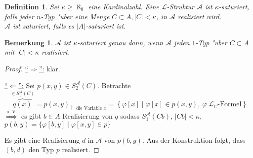 \documentclass[a4paper,12pt,numbers=noenddot,parskip=full]{scrartcl}
\newcommand{\scrL}{\mathcal{L}}
\newcommand{\scrA}{\mathcal{A}}
\theoremstyle{dotless}
\newtheorem{definition}[theorem]{Definition}
\newtheorem{remark}[theorem]{Bemerkung}
\begin{document}
\begin{definition}
	Sei $\kappa \geq \aleph_0$ eine Kardinalzahl. Eine $\scrL$-Struktur $\scrA$ ist \emph{$\kappa$-saturiert}, falls jeder $n$-Typ "uber eine Menge $C \subset A, |C|<\kappa$, in $\scrA$ realisiert wird.\\
	$\scrA$ ist \emph{saturiert}, falls es $|A|$-saturiert ist.
\end{definition}
\begin{remark}
	$\scrA$ ist $\kappa$-saturiert genau dann, wenn $\scrA$ jeden $1$-Typ "uber $C \subset A$ mit $|C| < \kappa$ realisiert.
\end{remark}
\begin{proof}
	\underline{"`$\Rightarrow$"':} klar.
	
	\underline{"`$\Leftarrow$"':} Sei $p(x,y) \in S_2^\scrA(C)$. Betrachte \begin{equation*}
		\overbrace{q(x)}^{\in S_1^\scrA(C)} = p(x,y)_{\upharpoonright \text{ die Variable }x}=\left\{\varphi[x] \mid \varphi[x] \in p(x,y),~ \varphi~\scrL_C \text{-Formel} \right\}
	\end{equation*}
	$\overset{\text{n. V.}}{\Longrightarrow}$ es gibt $b \in A$ Realisierung von $q$ sodass $S_1^\scrA(Cb)$, $|Cb| < \kappa$, $p(b,y) = \{\varphi[b,y] \mid \varphi[x,y] \in p \}$
	
	Es gibt eine Realisierung $d$ in $\scrA$ von $p(b,y)$. Aus der Konstruktion folgt, dass $(b,d)$ den Typ $p$ realisiert.
\end{proof}
\end{document}
